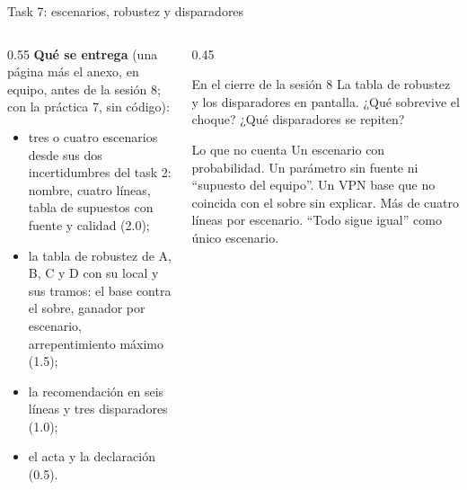 \documentclass{beamer}
\begin{document}
\begin{frame}{Task 7: escenarios, robustez y disparadores}
\begin{columns}[T]
\begin{column}{0.55\textwidth}
\small
\textbf{Qué se entrega} (una página más el anexo, en equipo, antes de la sesión 8; con la práctica 7, sin código):
\begin{itemize}\itemsep3pt
  \item tres o cuatro escenarios desde sus dos incertidumbres del task 2: nombre, cuatro líneas, tabla de supuestos con fuente y calidad (2.0);
  \item la tabla de robustez de A, B, C y D con su local y sus tramos: el base contra el sobre, ganador por escenario, arrepentimiento máximo (1.5);
  \item la recomendación en seis líneas y tres disparadores (1.0);
  \item el acta y la declaración (0.5).
\end{itemize}
\end{column}
\begin{column}{0.45\textwidth}
\small
\begin{exampleblock}{En el cierre de la sesión 8}
La tabla de robustez y los disparadores en pantalla. ¿Qué sobrevive el choque? ¿Qué disparadores se repiten?
\end{exampleblock}
\begin{alertblock}{Lo que no cuenta}
Un escenario con probabilidad. Un parámetro sin fuente ni ``supuesto del equipo''. Un VPN base que no coincida con el sobre sin explicar. Más de cuatro líneas por escenario. ``Todo sigue igual'' como único escenario.
\end{alertblock}
\end{column}
\end{columns}
\end{frame}
\end{document}
